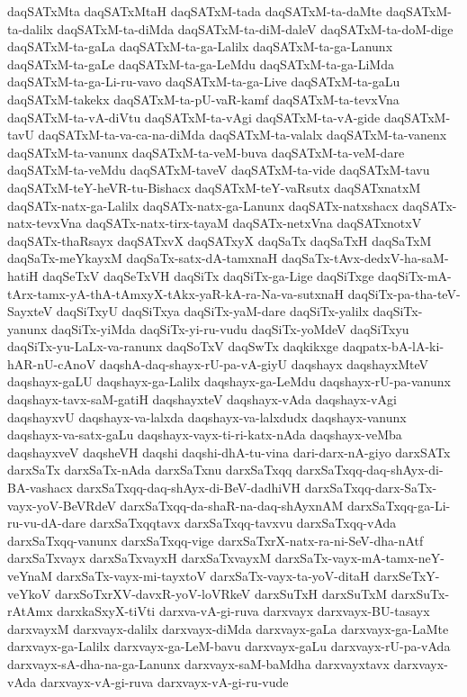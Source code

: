 {daqSATxMta
daqSATxMtaH
daqSATxM-tada
daqSATxM-ta-daMte
daqSATxM-ta-dalilx
daqSATxM-ta-diMda
daqSATxM-ta-diM-daleV
daqSATxM-ta-doM-dige
daqSATxM-ta-gaLa
daqSATxM-ta-ga-Lalilx
daqSATxM-ta-ga-Lanunx
daqSATxM-ta-gaLe
daqSATxM-ta-ga-LeMdu
daqSATxM-ta-ga-LiMda
daqSATxM-ta-ga-Li-ru-vavo
daqSATxM-ta-ga-Live
daqSATxM-ta-gaLu
daqSATxM-takekx
daqSATxM-ta-pU-vaR-kamf
daqSATxM-ta-tevxVna
daqSATxM-ta-vA-diVtu
daqSATxM-ta-vAgi
daqSATxM-ta-vA-gide
daqSATxM-tavU
daqSATxM-ta-va-ca-na-diMda
daqSATxM-ta-valalx
daqSATxM-ta-vanenx
daqSATxM-ta-vanunx
daqSATxM-ta-veM-buva
daqSATxM-ta-veM-dare
daqSATxM-ta-veMdu
daqSATxM-taveV
daqSATxM-ta-vide
daqSATxM-tavu
daqSATxM-teY-heVR-tu-Bishacx
daqSATxM-teY-vaRsutx
daqSATxnatxM
daqSATx-natx-ga-Lalilx
daqSATx-natx-ga-Lanunx
daqSATx-natxshacx
daqSATx-natx-tevxVna
daqSATx-natx-tirx-tayaM
daqSATx-netxVna
daqSATxnotxV
daqSATx-thaRsayx
daqSATxvX
daqSATxyX
daqSaTx
daqSaTxH
daqSaTxM
daqSaTx-meYkayxM
daqSaTx-satx-dA-tamxnaH
daqSaTx-tAvx-dedxV-ha-saM-hatiH
daqSeTxV
daqSeTxVH
daqSiTx
daqSiTx-ga-Lige
daqSiTxge
daqSiTx-mA-tArx-tamx-yA-thA-tAmxyX-tAkx-yaR-kA-ra-Na-va-sutxnaH
daqSiTx-pa-tha-teV-SayxteV
daqSiTxyU
daqSiTxya
daqSiTx-yaM-dare
daqSiTx-yalilx
daqSiTx-yanunx
daqSiTx-yiMda
daqSiTx-yi-ru-vudu
daqSiTx-yoMdeV
daqSiTxyu
daqSiTx-yu-LaLx-va-ranunx
daqSoTxV
daqSwTx
daqkikxge
daqpatx-bA-lA-ki-hAR-nU-cAnoV
daqshA-daq-shayx-rU-pa-vA-giyU
daqshayx
daqshayxMteV
daqshayx-gaLU
daqshayx-ga-Lalilx
daqshayx-ga-LeMdu
daqshayx-rU-pa-vanunx
daqshayx-tavx-saM-gatiH
daqshayxteV
daqshayx-vAda
daqshayx-vAgi
daqshayxvU
daqshayx-va-lalxda
daqshayx-va-lalxdudx
daqshayx-vanunx
daqshayx-va-satx-gaLu
daqshayx-vayx-ti-ri-katx-nAda
daqshayx-veMba
daqshayxveV
daqsheVH
daqshi
daqshi-dhA-tu-vina
dari-darx-nA-giyo
darxSATx
darxSaTx
darxSaTx-nAda
darxSaTxnu
darxSaTxqq
darxSaTxqq-daq-shAyx-di-BA-vashacx
darxSaTxqq-daq-shAyx-di-BeV-dadhiVH
darxSaTxqq-darx-SaTx-vayx-yoV-BeVRdeV
darxSaTxqq-da-shaR-na-daq-shAyxnAM
darxSaTxqq-ga-Li-ru-vu-dA-dare
darxSaTxqqtavx
darxSaTxqq-tavxvu
darxSaTxqq-vAda
darxSaTxqq-vanunx
darxSaTxqq-vige
darxSaTxrX-natx-ra-ni-SeV-dha-nAtf
darxSaTxvayx
darxSaTxvayxH
darxSaTxvayxM
darxSaTx-vayx-mA-tamx-neY-veYnaM
darxSaTx-vayx-mi-tayxtoV
darxSaTx-vayx-ta-yoV-ditaH
darxSeTxY-veYkoV
darxSoTxrXV-davxR-yoV-loVRkeV
darxSuTxH
darxSuTxM
darxSuTx-rAtAmx
darxkaSxyX-tiVti
darxva-vA-gi-ruva
darxvayx
darxvayx-BU-tasayx
darxvayxM
darxvayx-dalilx
darxvayx-diMda
darxvayx-gaLa
darxvayx-ga-LaMte
darxvayx-ga-Lalilx
darxvayx-ga-LeM-bavu
darxvayx-gaLu
darxvayx-rU-pa-vAda
darxvayx-sA-dha-na-ga-Lanunx
darxvayx-saM-baMdha
darxvayxtavx
darxvayx-vAda
darxvayx-vA-gi-ruva
darxvayx-vA-gi-ru-vude
}
